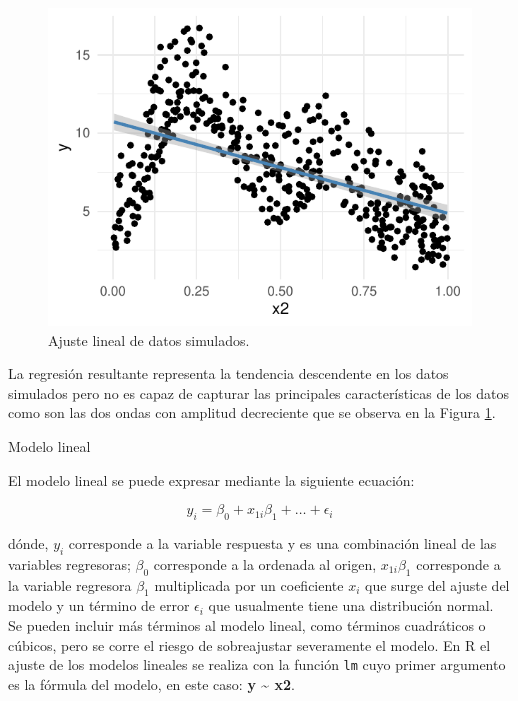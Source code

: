 \documentclass[
  12pt]{article}
\begin{document}
\begin{figure}[H]

{\centering \includegraphics{Manual_Generador_files/figure-latex/ajuste-lineal-1} 

}

\caption{Ajuste lineal de datos simulados.}\label{fig:ajuste-lineal}
\end{figure}

La regresión resultante representa la tendencia descendente en los datos simulados pero no es capaz de capturar las principales características de los datos como son las dos ondas con amplitud decreciente que se observa en la Figura \ref{fig:ajuste-lineal}.

Modelo lineal

El modelo lineal se puede expresar mediante la siguiente ecuación:

\[
y_i = \beta_0 + x_{1i}\beta_1 + \ldots + \epsilon_i 
\]

dónde, \(y_i\) corresponde a la variable respuesta y es una combinación lineal de las variables regresoras; \(\beta_0\) corresponde a la ordenada al origen, \(x_{1i}\beta_1\) corresponde a la variable regresora \(\beta_1\) multiplicada por un coeficiente \(x_{i}\) que surge del ajuste del modelo y un término de error \(\epsilon_i\) que usualmente tiene una distribución normal.
Se pueden incluir más términos al modelo lineal, como términos cuadráticos o cúbicos, pero se corre el riesgo de sobreajustar severamente el modelo.
En R el ajuste de los modelos lineales se realiza con la función \texttt{lm} cuyo primer argumento es la fórmula del modelo, en este caso: \textbf{y \textasciitilde{} x2}.
\end{document}
